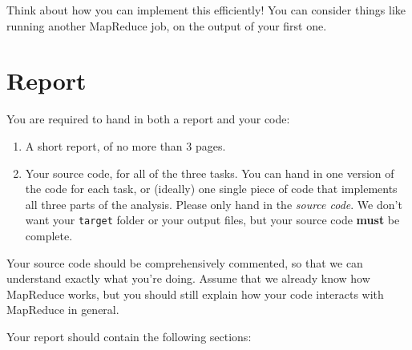 \documentclass[a4paper,10pt]{article}
\begin{document}
  Think about how you can implement this efficiently! You can consider things like running another MapReduce job, on the output of your first one.

  \pagebreak
  \section{Report} \label{sec:report}

  You are required to hand in both a report and your code:
  
  \begin{enumerate}
    \item A short report, of no more than 3 pages.
    \item Your source code, for all of the three tasks. You can hand in one version of the code for each task, or (ideally) one single piece of code that implements all three parts of the analysis. Please only hand in the \emph{source code}. We don't want your \texttt{target} folder or your output files, but your source code \textbf{must} be complete.
  \end{enumerate}

  Your source code should be comprehensively commented, so that we can understand exactly what you're doing. Assume that we already know how
  MapReduce works, but you should still explain how your code interacts with MapReduce in general.
  
  Your report should contain the following sections:
  
\end{document}
